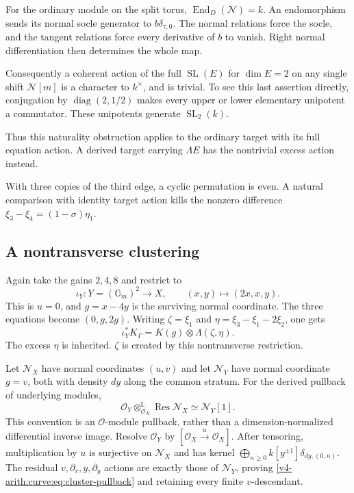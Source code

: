 For the ordinary module on the split torus,
$\operatorname{End}_D(\mathcal N)=k$.
An endomorphism sends its normal socle generator to
$b\delta_{\tau,0}$. The normal relations force the socle,
and the tangent relations force every derivative of $b$ to vanish.
Right normal differentiation then determines the whole map.

Consequently a coherent action of the full $\operatorname{SL}(E)$
for $\dim E=2$ on any single shift $\mathcal N[m]$ is a character
to $k^\times$, and is trivial. To see this last assertion directly,
conjugation by $\operatorname{diag}(2,1/2)$ makes every upper
or lower elementary unipotent a commutator. These unipotents
generate $\operatorname{SL}_2(k)$.

Thus this naturality obstruction applies to the ordinary target
with its full equation action. A derived target carrying
$\Lambda E$ has the nontrivial excess action instead.

With three copies of the third edge, a cyclic permutation is even.
A natural comparison with identity target action kills the
nonzero difference $\xi_3-\xi_4=(1-\sigma)\eta_1$.

\subsection{A nontransverse clustering}

Again take the gains $2,4,8$ and restrict to
\[
 \iota_Y:Y=(\mathbb G_m)^2\longrightarrow X,\qquad
 (x,y)\longmapsto(2x,x,y).
\]
This is $u=0$, and $g=x-4y$ is the surviving normal coordinate.
The three equations become $(0,g,2g)$.
Writing $\zeta=\xi_1$ and
$\eta=\xi_3-\xi_1-2\xi_2$, one gets
\[
 \iota_Y^*K_\Gamma=K(g)\otimes\Lambda(\zeta,\eta).
\]
The excess $\eta$ is inherited. $\zeta$ is created by this
nontransverse restriction.

Let $\mathcal N_X$ have normal coordinates $(u,v)$ and let
$\mathcal N_Y$ have normal coordinate $g=v$, both with density
$dy$ along the common stratum. For the derived pullback of
underlying modules,
\begin{equation}\label{v4-arith:curve:eq:cluster-pullback}
 \mathcal O_Y\otimes_{\mathcal O_X}^{\mathbb L}
          \operatorname{Res}\mathcal N_X
 \simeq\mathcal N_Y[1].
\end{equation}
This convention is an $\mathcal O$-module pullback, rather than
a dimension-normalized differential inverse image.
Resolve $\mathcal O_Y$ by
$[\mathcal O_X\xrightarrow{u}\mathcal O_X]$.
After tensoring, multiplication by $u$ is surjective on
$\mathcal N_X$ and has kernel
$\bigoplus_{n\geq0}k[y^{\pm1}]\delta_{dy,(0,n)}$.
The residual $v,\partial_v,y,\partial_y$ actions are exactly
those of $\mathcal N_Y$, proving
\eqref{v4-arith:curve:eq:cluster-pullback} and retaining every
finite $v$-descendant.

